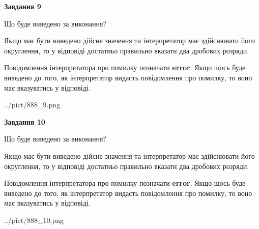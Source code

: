 \documentclass[12pt, ukrainian]{article}
\begin{document}
{\begin {Large}
{\begin {center}\textbf{Завдання 9}\end {center}}\par
Що буде виведено за виконання? \par

Якщо має бути виведено дійсне значення та інтерпретатор має здійснювати його округлення, 
то у відповіді достатньо правильно вказати два дробових розряди.

Повідомлення інтерпретатора про помилку позначати \textbf{error}.
Якщо щось буде виведено до того, як інтерпретатор видасть повідомлення про помилку, 
то воно має вказуватись у відповіді. \par

\begin{center}
	{../pict/888_9.png}
\end{center}
\newpage

{\begin {center}\textbf{Завдання 10}\end {center}}\par
Що буде виведено за виконання? \par

Якщо має бути виведено дійсне значення та інтерпретатор має здійснювати його округлення, 
то у відповіді достатньо правильно вказати два дробових розряди.

Повідомлення інтерпретатора про помилку позначати \textbf{error}.
Якщо щось буде виведено до того, як інтерпретатор видасть повідомлення про помилку, 
то воно має вказуватись у відповіді. \par

\begin{center}
	{../pict/888_10.png}
\end{center}
\newpage

\end {Large}}
\end{document}
